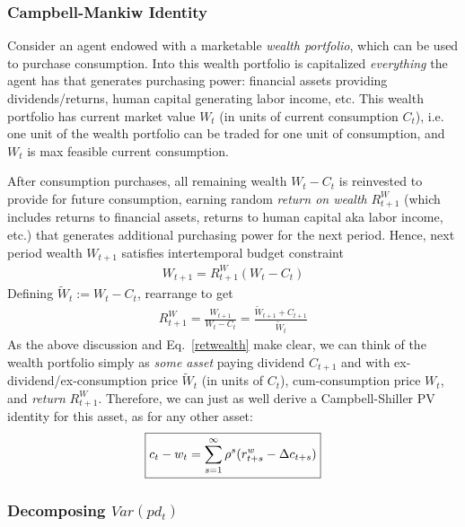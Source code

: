 \documentclass[12pt]{article}
\theoremstyle{plain}
\theoremstyle{definition}
\theoremstyle{remark}
\begin{document}
\begin{multicols*}{2}
\columnbreak
\subsubsection{Campbell-Mankiw Identity}

Consider an agent endowed with a marketable \emph{wealth portfolio},
which can be used to purchase consumption.
Into this wealth portfolio is capitalized \emph{everything} the agent
has that generates purchasing power: financial assets providing
dividends/returns, human capital generating labor income, etc.  This
wealth portfolio has current market value $W_t$ (in units of current
consumption $C_t$), i.e. one unit of the wealth portfolio can be traded
for one unit of consumption, and $W_t$ is max feasible
current consumption.

After consumption purchases, all remaining wealth $W_t-C_t$ is
reinvested to provide for future consumption, earning random
\emph{return on wealth} $R^W_{t+1}$ (which includes returns to financial
assets, returns to human capital aka labor income, etc.) that
generates additional purchasing power for the next period.
Hence, next period wealth $W_{t+1}$ satisfies intertemporal
budget constraint
\begin{align*}
  W_{t+1} = R_{t+1}^W(W_t-C_t)
\end{align*}
Defining $\tilde{W}_t:=W_t-C_t$, rearrange to get
\begin{align}
  R_{t+1}^W
  = \frac{W_{t+1}}{W_t-C_t}
  = \frac{\tilde{W}_{t+1}+C_{t+1}}{\tilde{W}_t}
  \label{retwealth}
\end{align}
As the above discussion and Eq.~\ref{retwealth} make clear, we can think
of the wealth portfolio simply as \emph{some asset} paying dividend
$C_{t+1}$ and with ex-dividend/ex-consumption price $\tilde{W}_{t}$ (in
units of $C_t$), cum-consumption price $W_t$, and \emph{return}
$R_{t+1}^W$.  Therefore, we can just as well derive a Campbell-Shiller
PV identity for this asset, as for any other asset:
\begin{align}
  \boxed{%
  c_t-w_t
  = \sum_{s=1}^\infty \rho^s (r^w_{t+s}-\Delta c_{t+s})
  }
  \label{wcidentityinf}
\end{align}


\columnbreak
\subsubsection{Decomposing $Var(pd_t)$}
\label{sec:decompvar}


\end{multicols*}
\end{document}
